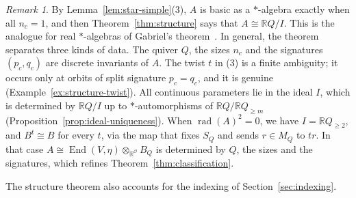 \documentclass[12pt, a4paper]{report}
\theoremstyle{plain}
\theoremstyle{definition}
\theoremstyle{remark}
\newtheorem{remark}[theorem]{Remark}
\theoremstyle{plain}
\newcommand{\rad}[0]{\operatorname{rad}} %
\newcommand{\RR}{\mathbb{R}}
\DeclareMathOperator{\End}{End}
\begin{document}
\begin{remark}\label{rem:structure}
By Lemma~\ref{lem:star-simple}(3), $A$ is basic as a $*$-algebra exactly when all $n_c=1$, and then Theorem~\ref{thm:structure} says that $A\cong\RR Q/I$. This is the analogue for real $*$-algebras of Gabriel's theorem~\cite[Theorem~II.3.7]{AssemSimsonSkowronski2006}. In general, the theorem separates three kinds of data. The quiver $Q$, the sizes $n_c$ and the signatures $(p_c,q_c)$ are discrete invariants of $A$. The twist $t$ in (3) is a finite ambiguity; it occurs only at orbits of split signature $p_c=q_c$, and it is genuine (Example~\ref{ex:structure-twist}). All continuous parameters lie in the ideal $I$, which is determined by $\RR Q/I$ up to $*$-automorphisms of $\RR Q/\RR Q_{\geq m}$ (Proposition~\ref{prop:ideal-uniqueness}). When $\rad(A)^2=0$, we have $I=\RR Q_{\geq2}$, and $B^t\cong B$ for every $t$, via the map that fixes $S_Q$ and sends $r\in M_Q$ to $tr$. In that case $A\cong\End(V,\eta)\otimes_{\RR^{\mathcal O}}B_Q$ is determined by $Q$, the sizes and the signatures, which refines Theorem~\ref{thm:classification}.
\end{remark}


The structure theorem also accounts for the indexing of Section~\ref{sec:indexing}.
\end{document}
